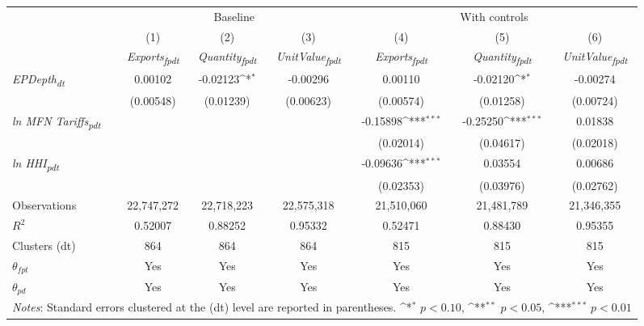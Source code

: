 {
\def\sym#1{\ifmmode^{#1}\else\(^{#1}\)\fi}
\begin{tabular}{l*{6}{c}}
\toprule
&\multicolumn{3}{c}{Baseline}&\multicolumn{3}{c}{With controls}\\\cmidrule(lr){2-4}\cmidrule(lr){5-7}
&(1)&(2)&(3)&(4)&(5)&(6)\\
&\textit{Exports\textsubscript{fpdt}}&\textit{Quantity\textsubscript{fpdt}}&\textit{UnitValue\textsubscript{fpdt}}&\textit{Exports\textsubscript{fpdt}}&\textit{Quantity\textsubscript{fpdt}}&\textit{UnitValue\textsubscript{fpdt}}\\
\midrule
\textit{EPDepth\textsubscript{dt}} & 0.00102 & -0.02123\sym{*} & -0.00296 & 0.00110 & -0.02120\sym{*} & -0.00274\\
 & (0.00548) & (0.01239) & (0.00623) & (0.00574) & (0.01258) & (0.00724)\\
\addlinespace
\textit{ln MFN Tariffs\textsubscript{pdt}} &  &  &  & -0.15898\sym{***} & -0.25250\sym{***} & 0.01838\\
 &  &  &  & (0.02014) & (0.04617) & (0.02018)\\
\addlinespace
\textit{ln HHI\textsubscript{pdt}} &  &  &  & -0.09636\sym{***} & 0.03554 & 0.00686\\
 &  &  &  & (0.02353) & (0.03976) & (0.02762)\\
\midrule
Observations & 22,747,272 & 22,718,223 & 22,575,318 & 21,510,060 & 21,481,789 & 21,346,355\\
$R^{2}$ & 0.52007 & 0.88252 & 0.95332 & 0.52471 & 0.88430 & 0.95355\\
Clusters (dt) & 864 & 864 & 864 & 815 & 815 & 815\\
$\theta_{fpt}$ & Yes & Yes & Yes & Yes & Yes & Yes\\
$\theta_{pd}$ & Yes & Yes & Yes & Yes & Yes & Yes\\
\bottomrule
\multicolumn{7}{l}{\footnotesize \textit{Notes}: Standard errors clustered at the (dt) level are reported in parentheses. \sym{*} \(p<0.10\), \sym{**} \(p<0.05\), \sym{***} \(p<0.01\)}\\
\end{tabular}
}
